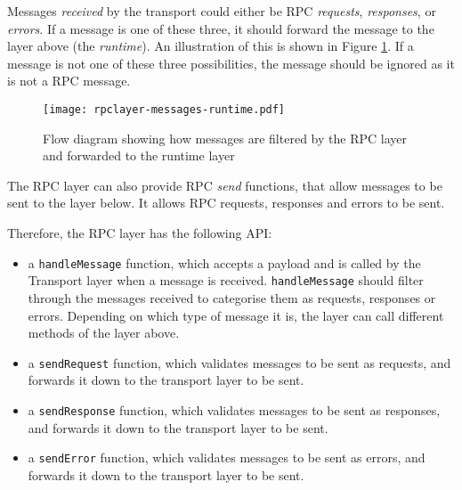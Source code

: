 Messages \emph{received} by the transport could either be RPC \emph{requests}, \emph{responses}, or \emph{errors}. If a message is one of these three, it should forward the message to the layer above (the \emph{runtime}). An illustration of this is shown in Figure \ref{fig:rpclayer_messages_runtime}. If a message is not one of these three possibilities, the message should be ignored as it is not a RPC message.

\begin{figure}
    \centering
    \texttt{[image: rpclayer-messages-runtime.pdf]} 
    \caption{Flow diagram showing how messages are filtered by the RPC layer and forwarded to the runtime layer}
    \label{fig:rpclayer_messages_runtime}
\end{figure}

The RPC layer can also provide RPC \emph{send} functions, that allow messages to be sent to the layer below. It allows RPC requests, responses and errors to be sent.

Therefore, the RPC layer has the following API:
\begin{itemize}
	\item a \lstinline+handleMessage+ function, which accepts a payload and is called by the Transport layer when a message is received. \lstinline+handleMessage+ should filter through the messages received to categorise them as requests, responses or errors. Depending on which type of message it is, the layer can call different methods of the layer above.
	\item a \lstinline+sendRequest+ function, which validates messages to be sent as requests, and forwards it down to the transport layer to be sent.
	\item a \lstinline+sendResponse+ function, which validates messages to be sent as responses, and forwards it down to the transport layer to be sent.
	\item a \lstinline+sendError+ function, which validates messages to be sent as errors, and forwards it down to the transport layer to be sent.
\end{itemize}

